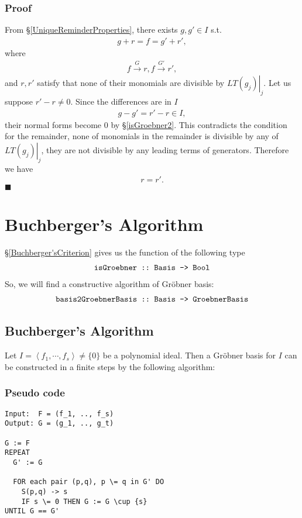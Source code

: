 \documentclass[11pt]{book}
\begin{document}
\subsubsection{Proof}
From \S\ref{UniqueReminderProperties}, there exists $g, g' \in I$ s.t.
\begin{eqnarray}
g + r = f = g' + r',
\end{eqnarray}
where 
\begin{eqnarray}
f \stackrel{G}{\to} r, f \stackrel{G'}{\to} r',
\end{eqnarray}
and $r,r'$ satisfy that none of their monomials are divisible by $\left. LT(g_j) \right|_j$.
Let us suppose $r' - r \neq 0$.
Since the differences are in $I$
\begin{eqnarray}
g - g' = r' - r \in I,
\end{eqnarray}
their normal forms become 0 by \S\ref{isGroebner2}.
This contradicts the condition for the remainder, none of monomials in the remainder is divisible by any of $\left. LT(g_j) \right|_j$, they are not divisible by any leading terms of generators.
Therefore we have 
\begin{eqnarray}
r = r'.
\end{eqnarray}
$\blacksquare$

\section{Buchberger's Algorithm}
\S\ref{Buchberger'sCriterion} gives us the function of the following type
\begin{eqnarray}
\verb|isGroebner :: Basis -> Bool|
\end{eqnarray}
So, we will find a constructive algorithm of Gr\"obner basis:
\begin{eqnarray}
\verb|basis2GroebnerBasis :: Basis -> GroebnerBasis|
\end{eqnarray}

\subsection{Buchberger's Algorithm}
Let $I = \left< f_1, \cdots, f_s \right> \neq \{0\}$ be a polynomial ideal.
Then a Gr\"obner basis for $I$ can be constructed in a finite steps by the following algorithm:

\subsubsection{Pseudo code}
\begin{verbatim}
Input:  F = (f_1, .., f_s)
Output: G = (g_1, .., g_t)

G := F
REPEAT
  G' := G
  
  FOR each pair (p,q), p \= q in G' DO
    S(p,q) -> s
    IF s \= 0 THEN G := G \cup {s}
UNTIL G == G'
\end{verbatim}
\end{document}
